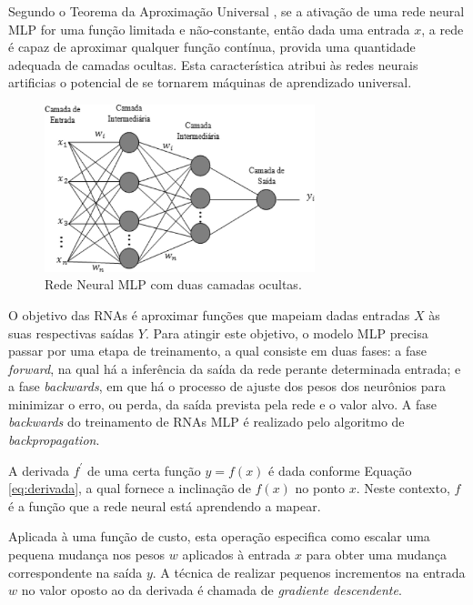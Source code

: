 Segundo o Teorema da Aproximação Universal \cite{hornik1991approximation}, se a ativação de uma rede neural MLP for uma função limitada e não-constante, então dada uma entrada $x$, a rede é capaz de aproximar qualquer função contínua, provida uma quantidade adequada de camadas ocultas. Esta característica atribui às redes neurais artificias o potencial de se tornarem máquinas de aprendizado universal. 

\begin{figure}[ht]
	\centering
	\caption{Rede Neural MLP com duas camadas ocultas.}
	\label{fig:mlp}
	\includegraphics[width=0.7\textwidth]{img/mlprna.jpg}
\end{figure}

O objetivo das RNAs é aproximar funções que mapeiam dadas entradas $X$ às suas respectivas saídas $Y$. Para atingir este objetivo, o modelo MLP precisa passar por uma etapa de treinamento, a qual consiste em duas fases: a fase \emph{forward}, na qual há a inferência da saída da rede perante determinada entrada; e a fase \emph{backwards}, em que há o processo de ajuste dos pesos dos neurônios para minimizar o erro, ou perda, da saída prevista pela rede e o valor alvo. A fase \emph{backwards} do treinamento de RNAs MLP é realizado pelo algoritmo de \emph{backpropagation}. 



\iffalse

A derivada $f^\prime$ de uma certa função $y = f(x)$ é dada conforme Equação \ref{eq:derivada}, a qual fornece a inclinação de $f(x)$ no ponto $x$. Neste contexto, $f$ é a função que a rede neural está aprendendo a mapear.

Aplicada à uma função de custo, esta operação especifica como escalar uma pequena mudança nos pesos $w$ aplicados à entrada $x$ para obter uma mudança correspondente na saída $y$. A técnica de realizar pequenos incrementos na entrada $w$ no valor oposto ao da derivada é chamada de \emph{gradiente descendente}. 

